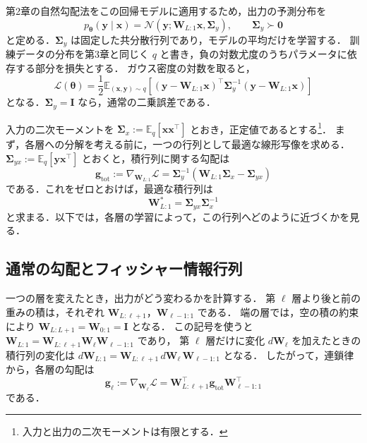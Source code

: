 \documentclass[../main.tex]{subfiles}
\begin{document}
第2章の自然勾配法をこの回帰モデルに適用するため，出力の予測分布を
\begin{equation}
  p_{\bm{\theta}}(\bm{y}\mid\bm{x})
  =\mathcal{N}\!\left(\bm{y};
  \bm{W}_{L:1}\bm{x},\bm{\Sigma}_{y}\right),
  \qquad\bm{\Sigma}_{y}\succ\bm{0}
  \label{eq:linear-predictive-model}
\end{equation}
と定める．$\bm{\Sigma}_{y}$ は固定した共分散行列であり，モデルの平均だけを学習する．
訓練データの分布を第3章と同じく $q$ と書き，負の対数尤度のうちパラメータに依存する部分を損失とする．
ガウス密度の対数を取ると，
\begin{equation}
  \mathcal{L}(\bm{\theta})
  =\frac12\mathbb{E}_{(\bm{x},\bm{y})\sim q}
  \left[(\bm{y}-\bm{W}_{L:1}\bm{x})^\top
  \bm{\Sigma}_{y}^{-1}
  (\bm{y}-\bm{W}_{L:1}\bm{x})\right]
  \label{eq:linear-regression-loss}
\end{equation}
となる．$\bm{\Sigma}_{y}=\bm{I}$ なら，通常の二乗誤差である．

入力の二次モーメントを $\bm{\Sigma}_{x}:=\mathbb{E}_{q}[\bm{x}\bm{x}^\top]$ とおき，正定値であるとする\footnote{入力と出力の二次モーメントは有限とする．}．
まず，各層への分解を考える前に，一つの行列として最適な線形写像を求める．
$\bm{\Sigma}_{yx}:=\mathbb{E}_{q}[\bm{y}\bm{x}^\top]$ とおくと，積行列に関する勾配は
\begin{equation}
  \bm{g}_{\mathrm{tot}}
  :=\nabla_{\bm{W}_{L:1}}\mathcal{L}
  =\bm{\Sigma}_{y}^{-1}
  (\bm{W}_{L:1}\bm{\Sigma}_{x}-\bm{\Sigma}_{yx})
  \label{eq:linear-total-gradient}
\end{equation}
である．これをゼロとおけば，最適な積行列は
\begin{equation}
  \bm{W}_{L:1}^*
  =\bm{\Sigma}_{yx}\bm{\Sigma}_{x}^{-1}
  \label{eq:linear-optimum}
\end{equation}
と求まる．以下では，各層の学習によって，この行列へどのように近づくかを見る．

\subsection{通常の勾配とフィッシャー情報行列}

一つの層を変えたとき，出力がどう変わるかを計算する．
第 $\ell$ 層より後と前の重みの積は，それぞれ
$\bm{W}_{L:\ell+1}$，$\bm{W}_{\ell-1:1}$ である．
端の層では，空の積の約束により $\bm{W}_{L:L+1}=\bm{W}_{0:1}=\bm{I}$ となる．
この記号を使うと $\bm{W}_{L:1}=\bm{W}_{L:\ell+1}\bm{W}_\ell\bm{W}_{\ell-1:1}$ であり，
第 $\ell$ 層だけに変化 $d\bm{W}_\ell$ を加えたときの積行列の変化は
$d\bm{W}_{L:1}=\bm{W}_{L:\ell+1}\,d\bm{W}_\ell\,\bm{W}_{\ell-1:1}$ となる．
したがって，連鎖律から，各層の勾配は
\begin{equation}
  \bm{g}_\ell:=\nabla_{\bm{W}_\ell}\mathcal{L}
  =\bm{W}_{L:\ell+1}^\top\bm{g}_{\mathrm{tot}}\bm{W}_{\ell-1:1}^\top
  \label{eq:linear-layer-gradient}
\end{equation}
である．
\end{document}
